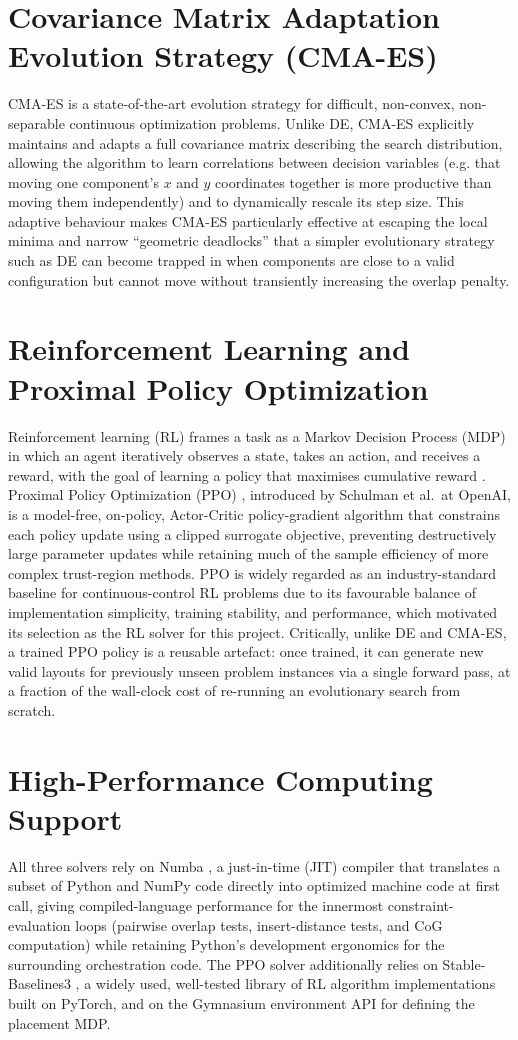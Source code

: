 \documentclass[11pt,a4paper,oneside]{report}
\begin{document}
\section{Covariance Matrix Adaptation Evolution Strategy (CMA-ES)}
CMA-ES \cite{hansen2016cma} is a state-of-the-art evolution strategy for difficult, non-convex, non-separable continuous optimization problems. Unlike DE, CMA-ES explicitly maintains and adapts a full covariance matrix describing the search distribution, allowing the algorithm to learn correlations between decision variables (e.g. that moving one component's $x$ and $y$ coordinates together is more productive than moving them independently) and to dynamically rescale its step size. This adaptive behaviour makes CMA-ES particularly effective at escaping the local minima and narrow ``geometric deadlocks'' that a simpler evolutionary strategy such as DE can become trapped in when components are close to a valid configuration but cannot move without transiently increasing the overlap penalty.

\section{Reinforcement Learning and Proximal Policy Optimization}
Reinforcement learning (RL) frames a task as a Markov Decision Process (MDP) in which an agent iteratively observes a state, takes an action, and receives a reward, with the goal of learning a policy that maximises cumulative reward \cite{sutton2018rl}. Proximal Policy Optimization (PPO) \cite{schulman2017ppo}, introduced by Schulman et al.\ at OpenAI, is a model-free, on-policy, Actor-Critic policy-gradient algorithm that constrains each policy update using a clipped surrogate objective, preventing destructively large parameter updates while retaining much of the sample efficiency of more complex trust-region methods. PPO is widely regarded as an industry-standard baseline for continuous-control RL problems due to its favourable balance of implementation simplicity, training stability, and performance, which motivated its selection as the RL solver for this project. Critically, unlike DE and CMA-ES, a trained PPO policy is a reusable artefact: once trained, it can generate new valid layouts for previously unseen problem instances via a single forward pass, at a fraction of the wall-clock cost of re-running an evolutionary search from scratch.

\section{High-Performance Computing Support}
All three solvers rely on Numba \cite{lam2015numba}, a just-in-time (JIT) compiler that translates a subset of Python and NumPy code directly into optimized machine code at first call, giving compiled-language performance for the innermost constraint-evaluation loops (pairwise overlap tests, insert-distance tests, and CoG computation) while retaining Python's development ergonomics for the surrounding orchestration code. The PPO solver additionally relies on Stable-Baselines3 \cite{raffin2021sb3}, a widely used, well-tested library of RL algorithm implementations built on PyTorch, and on the Gymnasium environment API for defining the placement MDP.
\end{document}
